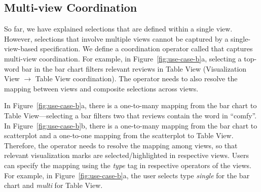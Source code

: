 \subsection{Multi-view Coordination}
So far, we have explained selections that are defined within a single view. However, selections that involve multiple views cannot be captured by a single-view-based specification. We define a coordination operator called  that captures multi-view coordination. For example, in Figure~\ref{fig:use-case-b}a, selecting a top-word bar in the bar chart filters relevant reviews in Table View (Visualization View $\rightarrow$ Table View coordination). The  operator needs to also resolve the mapping between views and composite selections across views.


In Figure~\ref{fig:use-case-b}a, there is a one-to-many mapping from the bar chart to Table View---selecting a bar filters two that reviews contain the word in ``comfy''.
In Figure~\ref{fig:use-case-b}b, there is a one-to-many mapping from the bar chart to scatterplot and a one-to-one mapping from the scatterplot to Table View. Therefore, the  operator needs to resolve the mapping among views, so that relevant visualization marks are selected/highlighted in respective views. Users can specify the mapping using the \emph{type} tag in respective  operators of the views. For example, in Figure~\ref{fig:use-case-b}a, the user selects type \emph{single} for the bar chart and \emph{multi} for Table View. 


